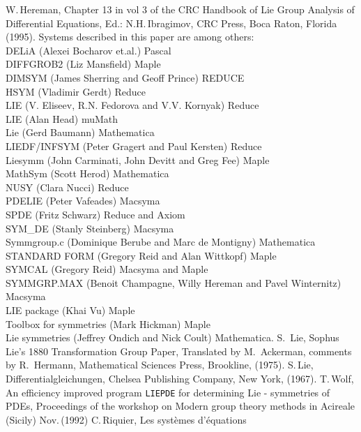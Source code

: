 \begin{thebibliography}{99}
 W.\,Hereman, Chapter 13 in vol 3 of the CRC Handbook of
Lie Group Analysis of Differential Equations, Ed.: N.H.\,Ibragimov,
CRC Press, Boca Raton, Florida (1995).
Systems described in this paper are among others:  \\
DELiA (Alexei Bocharov et.al.) Pascal \\
DIFFGROB2 (Liz Mansfield) Maple \\
DIMSYM (James Sherring and Geoff Prince) REDUCE \\
HSYM (Vladimir Gerdt) Reduce \\
LIE (V. Eliseev, R.N. Fedorova and V.V. Kornyak) Reduce \\
LIE (Alan Head) muMath \\
Lie (Gerd Baumann) Mathematica \\
LIEDF/INFSYM (Peter Gragert and Paul Kersten) Reduce \\
Liesymm (John Carminati, John Devitt and Greg Fee) Maple \\
MathSym (Scott Herod) Mathematica \\
NUSY (Clara Nucci) Reduce \\
PDELIE (Peter Vafeades) Macsyma \\
SPDE (Fritz Schwarz) Reduce and Axiom \\
SYM\_DE (Stanly Steinberg) Macsyma \\
Symmgroup.c (Dominique Berube and Marc de Montigny) Mathematica \\
STANDARD FORM (Gregory Reid and Alan Wittkopf) Maple \\
SYMCAL (Gregory Reid) Macsyma and Maple \\
SYMMGRP.MAX (Benoit Champagne, Willy Hereman and Pavel Winternitz) Macsyma \\
LIE package (Khai Vu) Maple \\
Toolbox for symmetries (Mark Hickman) Maple \\
Lie symmetries (Jeffrey Ondich and Nick Coult) Mathematica.
 S.\, Lie, Sophus Lie's 1880 Transformation Group Paper,
Translated by M.\, Ackerman, comments by R.\, Hermann, Mathematical Sciences 
Press, Brookline, (1975).
 S.\,Lie, Differentialgleichungen, Chelsea Publishing Company,
New York, (1967).
 T.\,Wolf, An efficiency improved program {\tt LIEPDE}
for determining Lie - symmetries of PDEs, Proceedings of the workshop on
Modern group theory methods in Acireale (Sicily) Nov.\,(1992)
 C.\,Riquier, Les syst\`{e}mes d'\'{e}quations 

\end{thebibliography}
